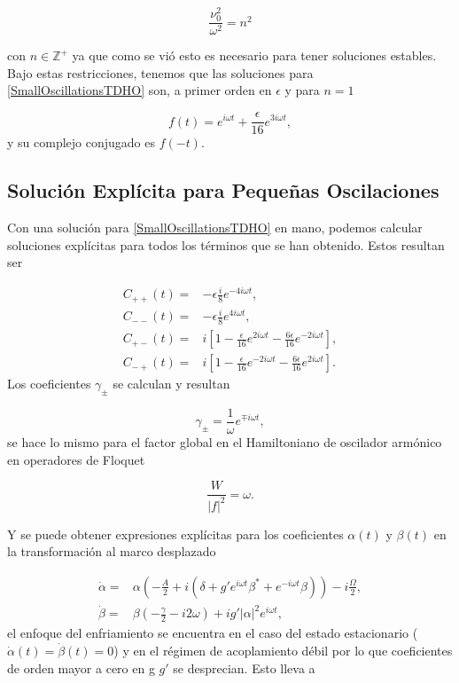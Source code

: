 \documentclass[10pt,a4paper]{report}
\begin{document}
\begin{equation}
\frac{\nu_0^2}{\omega^2} = n^2\label{scattering}
\end{equation}

con $n \in \mathbb{Z}^+$ ya que como se vió esto es necesario para tener soluciones estables\cite{WardFT}. Bajo estas restricciones, tenemos que las soluciones para \eqref{SmallOscillationsTDHO} son, a primer orden en $\epsilon$ y para $n=1$

\begin{equation}\label{SmallOscillationsSolution}
f(t)=  e^{i\omega t} + \frac{\epsilon}{16} e^{3i\omega t},
\end{equation} y su complejo conjugado es $f(-t)$.

\subsection{Solución Explícita para Pequeñas Oscilaciones }

Con una solución para \ref{SmallOscillationsTDHO} en mano, podemos calcular soluciones explícitas para todos los términos que se han obtenido. Estos resultan ser\cite{TesisMaestria}

\begin{align}
C_{++}(t) =& -\epsilon\frac{i}{8}e^{-4i\omega t},\\
C_{--}(t) =& -\epsilon\frac{i}{8}e^{4i\omega t},\\
C_{+-}(t) =& i [1 -\frac{\epsilon}{16}e^{2i\omega t}-\frac{6\epsilon}{16}e^{-2i\omega t}],\\
C_{-+}(t) =& i [1 -\frac{\epsilon}{16}e^{-2i\omega t}-\frac{6\epsilon}{16}e^{2i\omega t}].
\end{align} Los coeficientes $\gamma_{\pm}$ se calculan y resultan

\begin{equation}
\gamma_\pm= \frac{1}{\omega}e^{\mp i\omega t},
\end{equation} se hace lo mismo para el factor global en el Hamiltoniano de oscilador armónico en operadores de Floquet

\begin{equation}
\frac{W}{|f|^2} = \omega.
\end{equation} 

Y se puede obtener expresiones explícitas para los coeficientes $\alpha(t)$ y $\beta(t)$ en la transformación al marco desplazado

\begin{align}
\dot{\alpha} =& \alpha(-\frac{A}{2}+i(\delta+g'e^{i\omega t} \beta^* + e^{-i\omega t} \beta))-i\frac{\Omega}{2},\\
\dot{\beta} =& \beta(-\frac{\gamma}{2}-i 2\omega)+ig'|\alpha|^2e^{i\omega t},
\end{align} el enfoque del enfriamiento se encuentra en el caso del estado estacionario ($\dot{\alpha}(t)=\dot{\beta}(t)=0$) y en el régimen de acoplamiento débil por lo que coeficientes de orden mayor a cero en g $g'$ se desprecian. Esto lleva a 
\end{document}
